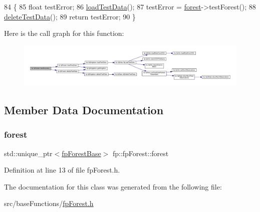 \begin{DoxyCode}
84                                 \{
85                 \textcolor{keywordtype}{float} testError;
86                 \hyperlink{classfp_1_1fpForest_abdcf008b65b6af7be5428d838b33be32}{loadTestData}();
87                 testError = \hyperlink{classfp_1_1fpForest_a4ce6af867d36c8d62c860db8982235c4}{forest}->testForest();
88                 \hyperlink{classfp_1_1fpForest_a3eb78e4e61b289853cc45021f2cf3de0}{deleteTestData}();
89                 \textcolor{keywordflow}{return} testError;
90             \}
\end{DoxyCode}
Here is the call graph for this function\+:
\nopagebreak
\begin{figure}[H]
\begin{center}
\leavevmode
\includegraphics[width=350pt]{classfp_1_1fpForest_a2ecaa11b48f37781f5fb4607ed6a490f_cgraph}
\end{center}
\end{figure}


\subsection{Member Data Documentation}
\mbox{\label{classfp_1_1fpForest_a4ce6af867d36c8d62c860db8982235c4}} 
\subsubsection{\texorpdfstring{forest}{forest}}
{\footnotesize\ttfamily std\+::unique\+\_\+ptr$<$\hyperlink{classfp_1_1fpForestBase}{fp\+Forest\+Base}$>$ fp\+::fp\+Forest\+::forest\hspace{0.3cm}{\ttfamily [protected]}}



Definition at line 13 of file fp\+Forest.\+h.



The documentation for this class was generated from the following file\+:\begin{DoxyCompactItemize}
\item 
src/base\+Functions/\hyperlink{fpForest_8h}{fp\+Forest.\+h}\end{DoxyCompactItemize}
